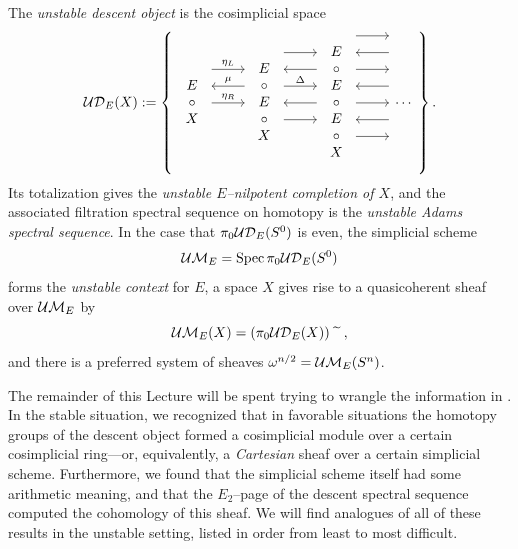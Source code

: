 \begin{definition}\label{UASSDefinition}
The \textit{unstable descent object} is the cosimplicial space
\[\sheaf{UD}_E(X) := \left\{
\begin{tikzcd}
\begin{array}{c} E \\ \circ \\ X \end{array} \arrow[leftarrow, shift left=\baselineskip]{r}{\mu} \arrow[shift left=(2*\baselineskip)]{r}{\eta_L} \arrow{r}{\eta_R} &
\begin{array}{c} E \\ \circ \\ E \\ \circ \\ X \end{array} \arrow[shift left=(3*\baselineskip)]{r} \arrow[leftarrow, shift left=(2*\baselineskip)]{r} \arrow[shift left=\baselineskip]{r}{\Delta} \arrow[leftarrow]{r} \arrow[shift right=\baselineskip]{r} &
\begin{array}{c} E \\ \circ \\ E \\ \circ \\ E \\ \circ \\ X \end{array} \arrow[shift left=(4*\baselineskip)]{r} \arrow[leftarrow, shift left=(3*\baselineskip)]{r} \arrow[shift left=(2*\baselineskip)]{r} \arrow[leftarrow, shift left=\baselineskip]{r} \arrow{r} \arrow[leftarrow, shift right=\baselineskip]{r} \arrow[shift right=(2*\baselineskip)]{r} &
\cdots
\end{tikzcd}
\right\}.\]
Its totalization gives the \textit{unstable \(E\)--nilpotent completion of \(X\)}, and the associated filtration spectral sequence on homotopy is the \textit{unstable Adams spectral sequence}.
In the case that \(\pi_0 \mathcal{UD}_E(S^0)\) is even, the simplicial scheme \[\mathcal{UM}_{E} = \operatorname{Spec} \pi_0 \mathcal{UD}_E(S^0)\] forms the \textit{unstable context} for \(E\), a space \(X\) gives rise to a quasicoherent sheaf over \(\mathcal{UM}_{E}\) by \[\mathcal{UM}_{E}(X) = (\pi_0 \mathcal{UD}_E(X))\widetilde{\quad},\] and there is a preferred system of sheaves \(\omega^{n/2} = \mathcal{UM}_{E}(S^n)\).
\end{definition}

The remainder of this Lecture will be spent trying to wrangle the information in .
In the stable situation, we recognized that in favorable situations the homotopy groups of the descent object formed a cosimplicial module over a certain cosimplicial ring---or, equivalently, a \emph{Cartesian} sheaf over a certain simplicial scheme.
Furthermore, we found that the simplicial scheme itself had some arithmetic meaning, and that the \(E_2\)--page of the descent spectral sequence computed the cohomology of this sheaf.
We will find analogues of all of these results in the unstable setting, listed in order from least to most difficult.


